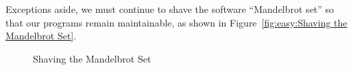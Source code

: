 Exceptions aside, we must continue to shave the software ``Mandelbrot
set'' so that our programs remain maintainable, as shown in
Figure~\ref{fig:easy:Shaving the Mandelbrot Set}.

\begin{figure}[htb]
\begin{center}
\end{center}
\caption{Shaving the Mandelbrot Set}
\end{figure}
